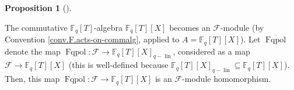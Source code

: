 \documentclass[numbers=enddot,12pt,final,onecolumn,notitlepage]{scrartcl}%
\theoremstyle{definition}
\newtheorem{prop}[theo]{Proposition}
\newenvironment{proposition}[1][]
{\begin{prop}[#1]\begin{leftbar}}
{\end{leftbar}\end{prop}}
\begin{document}
\begin{proposition}
\label{prop.F.Fqpol.Fmodhom}The commutative $\mathbb{F}_{q}\left[  T\right]
$-algebra $\mathbb{F}_{q}\left[  T\right]  \left[  X\right]  $ becomes an
$\mathcal{F}$-module (by Convention \ref{conv.F.acts-on-commalg}, applied to
$A=\mathbb{F}_{q}\left[  T\right]  \left[  X\right]  $). Let $\overline
{\operatorname*{Fqpol}}$ denote the map $\operatorname*{Fqpol}:\mathcal{F}%
\rightarrow\mathbb{F}_{q}\left[  T\right]  \left[  X\right]
_{q-\operatorname*{lin}}$, considered as a map $\mathcal{F}\rightarrow
\mathbb{F}_{q}\left[  T\right]  \left[  X\right]  $ (this is well-defined
because $\mathbb{F}_{q}\left[  T\right]  \left[  X\right]
_{q-\operatorname*{lin}}\subseteq\mathbb{F}_{q}\left[  T\right]  \left[
X\right]  $). Then, this map $\overline{\operatorname*{Fqpol}}:\mathcal{F}%
\rightarrow\mathbb{F}_{q}\left[  T\right]  \left[  X\right]  $ is an
$\mathcal{F}$-module homomorphism.
\end{proposition}
\end{document}
